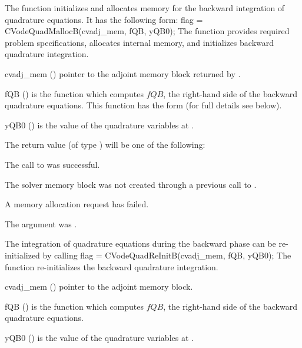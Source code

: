 The function  initializes and allocates memory for the backward
integration of quadrature equations. It has the following form:
{
flag = CVodeQuadMallocB(cvadj\_mem, fQB, yQB0);
}
{
  The function  provides required problem specifications,
  allocates internal memory, and initializes backward quadrature integration.
}
{
  \begin{args}
  \item[cvadj\_mem] ()
    pointer to the adjoint memory block returned by .
  \item[fQB] ()
    is the {\C} function which computes $fQB$, the right-hand side of the 
    backward quadrature equations. This function has the form 
     (for full details see below).
  \item[yQB0] ()
    is the value of the quadrature variables at .
  \end{args}
}
{
  The return value  (of type ) will be one of the following:
  \begin{args}
  \item[\Id{CV\_SUCCESS}]
    The call to  was successful.
  \item[\Id{CV\_MEM\_NULL}] 
    The {\cvodes} solver memory block was not created through a previous 
    call to .
  \item[\Id{CV\_MEM\_FAIL}] 
    A memory allocation request has failed.
  \item[\Id{CV\_ADJMEM\_NULL}]
    The  argument was .
  \end{args}
}
{}
The integration of quadrature equations during the backward phase can be
re-initialized by calling
{
  flag = CVodeQuadReInitB(cvadj\_mem, fQB, yQB0);
}
{
  The function  re-initializes the backward quadrature integration.
}
{
  \begin{args}
  \item[cvadj\_mem] ()
    pointer to the adjoint memory block.
  \item[fQB] ()
    is the {\C} function which computes $fQB$, the right-hand side of the 
    backward quadrature equations.
  \item[yQB0] ()
    is the value of the quadrature variables at .
  \end{args}
}

